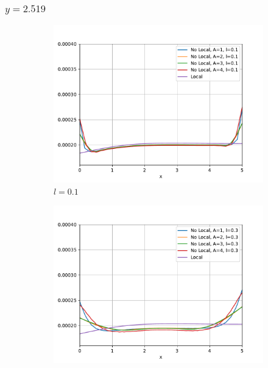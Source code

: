 	\subsubsection{\texorpdfstring{$y=2.519$}{y=2.519}}
		\begin{figure}
		    \centering
		    \sffamily
		    \begin{subfigure}{0.48\textwidth}
		    \centering
		        \includegraphics[width=\textwidth]{figuras/Placa/Perfiles/Y/Y0.1_2.519.pdf}
		        \caption{$l=0.1$}
		        \label{fig:perfilesY0259.01}
		    \end{subfigure}
		    \begin{subfigure}{0.48\textwidth}
		    \centering
		        \includegraphics[width=\textwidth]{figuras/Placa/Perfiles/Y/Y0.3_2.519.pdf}

\end{subfigure}
\end{figure}

